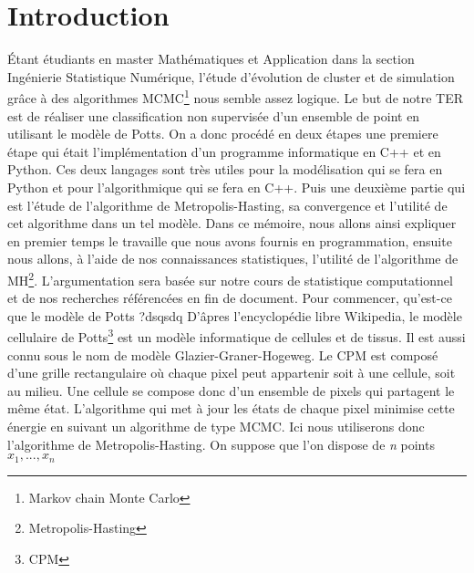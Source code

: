 \chapter*{Introduction}
\newcommand\tab[1][0.8cm]{\hspace*{#1}}

\begin{article}
    Étant étudiants en master Mathématiques et Application dans la section Ingénierie Statistique Numérique, l'étude d'évolution de cluster et de simulation grâce à des algorithmes MCMC\footnote{Markov chain Monte Carlo} nous semble assez logique.
Le but de notre TER est de réaliser une classification non supervisée d'un ensemble de point en utilisant le modèle de Potts.
On a donc procédé en deux étapes une premiere étape qui était l'implémentation d'un programme informatique en C++ et en Python.
Ces deux langages sont très utiles pour la modélisation qui se fera en Python et pour l'algorithmique qui se fera en C++.
Puis une deuxième partie qui est l'étude de l'algorithme de Metropolis-Hasting, sa convergence et l'utilité de cet algorithme dans un tel modèle.
Dans ce mémoire, nous allons ainsi expliquer en premier temps le travaille que nous avons fournis en programmation, ensuite nous allons, à l'aide de nos connaissances statistiques, l'utilité de l'algorithme de MH\footnote{Metropolis-Hasting}.
    \newline L'argumentation sera basée sur notre cours de statistique computationnel et de nos recherches référencées en fin de document.
    \newline \newline
    \tab Pour commencer, qu'est-ce que le modèle de Potts ?dsqsdq
    \newline D'âpres l'encyclopédie libre Wikipedia, le modèle cellulaire de Potts\footnote{CPM} est un modèle informatique de cellules et de tissus.
    Il est aussi connu sous le nom de modèle Glazier-Graner-Hogeweg.
    Le CPM est composé d'une grille rectangulaire où chaque pixel peut appartenir soit à une cellule, soit au milieu.
    Une cellule se compose donc d'un ensemble de pixels qui partagent le même état.
    L'algorithme qui met à jour les états de chaque pixel minimise cette énergie en suivant un algorithme de type MCMC.
    Ici nous utiliserons donc l'algorithme de Metropolis-Hasting.
    On suppose que l’on dispose de \textit{n} points $x_{1},...,x_{n}$
\end{article}